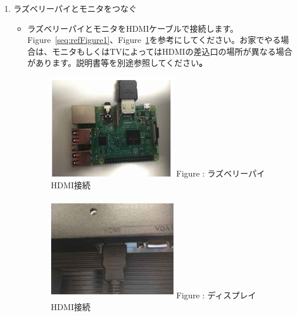 \documentclass[a4paper,12pt]{jarticle}
\begin{document}
\begin{enumerate}
  \item ラズベリーパイとモニタをつなぐ

        \begin{itemize}
          \item
                ラズベリーパイとモニタをHDMIケーブルで接続します。Figure~\ref{seq:refFigure1}、Figure~\ref{seq:refFigure2}を参考にしてください。お家でやる場合は、モニタもしくはTVによってはHDMIの差込口の場所が異なる場合があります。説明書等を別途参照してください\textbf{。}


                \begin{figure}[h]
                  \begin{minipage}{0.5\textwidth}
                    {\upshape
                      \includegraphics[width=5.519cm,height=4.471cm]{textbook-img015.png}
                      \newline
                      Figure {\theFigure\label{seq:refFigure1}}:
                      ラズベリーパイHDMI接続}
                  \end{minipage}
                  \begin{minipage}{0.5\textwidth}
                    {\upshape
                      \includegraphics[width=5.519cm,height=4.471cm]{textbook-img016.png}
                      \newline
                      Figure {\theFigure\label{seq:refFigure2}}:
                      ディスプレイHDMI接続}
                  \end{minipage}
                \end{figure}


\end{itemize}
\end{enumerate}
\end{document}
